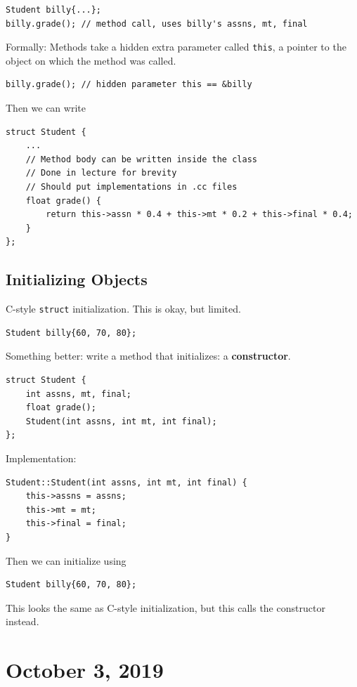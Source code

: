 \documentclass[11pt]{article}
\theoremstyle{definition}
\begin{document}
\begin{lstlisting}
Student billy{...};
billy.grade(); // method call, uses billy's assns, mt, final
\end{lstlisting}
Formally: Methods take a hidden extra parameter called {\tt this}, a pointer to the object on which the method was called.
\begin{lstlisting}
billy.grade(); // hidden parameter this == &billy
\end{lstlisting}
Then we can write
\begin{lstlisting}
struct Student {
    ...
    // Method body can be written inside the class
    // Done in lecture for brevity
    // Should put implementations in .cc files
    float grade() { 
        return this->assn * 0.4 + this->mt * 0.2 + this->final * 0.4;
    }
};
\end{lstlisting}

\subsection{Initializing Objects}

C-style {\tt struct} initialization. This is okay, but limited.
\begin{lstlisting}
Student billy{60, 70, 80};
\end{lstlisting}
Something better: write a method that initializes: a {\bf constructor}.
\begin{lstlisting}
struct Student {
    int assns, mt, final;
    float grade();
    Student(int assns, int mt, int final);
};
\end{lstlisting}
Implementation:
\begin{lstlisting}
Student::Student(int assns, int mt, int final) {
    this->assns = assns;
    this->mt = mt;
    this->final = final;
}
\end{lstlisting}
Then we can initialize using
\begin{lstlisting}
Student billy{60, 70, 80};
\end{lstlisting}
This looks the same as C-style initialization, but this calls the constructor instead.
\newpage
\section{October 3, 2019}
\end{document}
